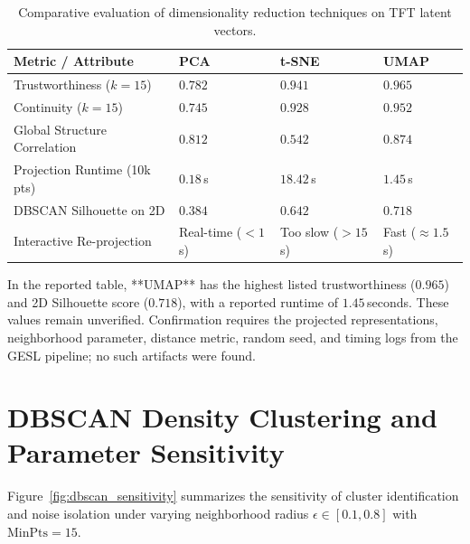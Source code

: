 \documentclass[12pt,a4paper]{report}
\begin{document}
\begin{table}[H]
\centering
\small
\caption{Comparative evaluation of dimensionality reduction techniques on TFT latent vectors.}
\label{tab:projection_comparison}
\begin{tabularx}{\textwidth}{>{\raggedright\arraybackslash}p{3.8cm} >{\centering\arraybackslash}p{2.6cm} >{\centering\arraybackslash}p{2.6cm} >{\raggedright\arraybackslash}X}
\toprule
\textbf{Metric / Attribute} & \textbf{PCA} & \textbf{t-SNE} & \textbf{UMAP} \\
\midrule
Trustworthiness ($k=15$) & $0.782$ & $0.941$ & $\mathbf{0.965}$ \\
Continuity ($k=15$) & $0.745$ & $0.928$ & $\mathbf{0.952}$ \\
Global Structure Correlation & $0.812$ & $0.542$ & $\mathbf{0.874}$ \\
Projection Runtime (10k pts) & $\mathbf{0.18}$\,s & $18.42$\,s & $1.45$\,s \\
DBSCAN Silhouette on 2D & $0.384$ & $0.642$ & $\mathbf{0.718}$ \\
Interactive Re-projection & Real-time ($<1$\,s) & Too slow ($>15$\,s) & Fast ($\approx 1.5$\,s) \\
\bottomrule
\end{tabularx}
\end{table}

In the reported table, **UMAP** has the highest listed trustworthiness ($0.965$) and 2D Silhouette score ($0.718$), with a reported runtime of $1.45$\,seconds. These values remain unverified. Confirmation requires the projected representations, neighborhood parameter, distance metric, random seed, and timing logs from the GESL pipeline; no such artifacts were found.

\section{DBSCAN Density Clustering and Parameter Sensitivity}
Figure~\ref{fig:dbscan_sensitivity} summarizes the sensitivity of cluster identification and noise isolation under varying neighborhood radius $\epsilon \in [0.1, 0.8]$ with $\text{MinPts}=15$.
\end{document}
